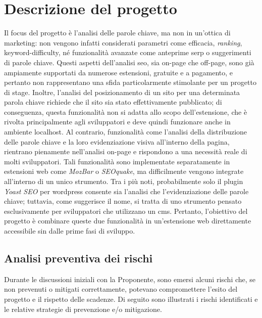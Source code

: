 \chapter{Descrizione del progetto}
\label{cap:descrizione-progetto}

Il focus del progetto è l’analisi delle parole chiave, ma non in un’ottica di marketing: non vengono infatti considerati parametri come efficacia, \textit{ranking}, \gls{keyword-difficulty}, né funzionalità avanzate come anteprime \gls{serp} o suggerimenti di parole chiave. Questi aspetti dell’analisi \gls{seo}, sia \gls{on-page} che \gls{off-page}, sono già ampiamente supportati da numerose estensioni, gratuite e a pagamento, e pertanto non rappresentano una sfida particolarmente stimolante per un progetto di stage. Inoltre, l’analisi del posizionamento di un sito per una determinata parola chiave richiede che il sito sia stato effettivamente pubblicato; di conseguenza, questa funzionalità non si adatta allo scopo dell’estensione, che è rivolta principalmente agli sviluppatori e deve quindi funzionare anche in ambiente \gls{localhost}. Al contrario, funzionalità come l’analisi della distribuzione delle parole chiave e la loro evidenziazione visiva all’interno della pagina, rientrano pienamente nell’analisi \gls{on-page} e rispondono a una necessità reale di molti sviluppatori. Tali funzionalità sono implementate separatamente in estensioni web come \textit{MozBar} o \textit{SEOquake}, ma difficilmente vengono integrate all’interno di un unico strumento. Tra i più noti, probabilmente solo il plugin \textit{Yoast SEO} per \gls{wordpress} consente sia l’analisi che l’evidenziazione delle parole chiave; tuttavia, come suggerisce il nome, si tratta di uno strumento pensato esclusivamente per sviluppatori che utilizzano un \gls{cms}. Pertanto, l’obiettivo del progetto è combinare queste due funzionalità in un’estensione web direttamente accessibile sin dalle prime fasi di sviluppo.

\section{Analisi preventiva dei rischi}
\label{sec:rischi}

Durante le discussioni iniziali con la Proponente, sono emersi alcuni rischi che, se non prevenuti o mitigati correttamente, potevano compromettere l’esito del progetto e il rispetto delle scadenze. Di seguito sono illustrati i rischi identificati e le relative strategie di prevenzione e/o mitigazione.

